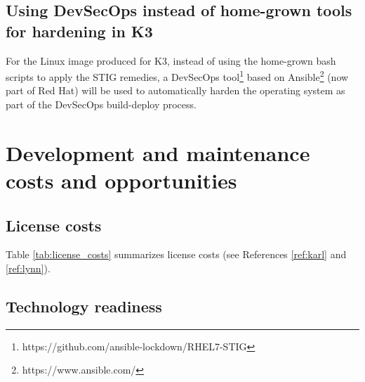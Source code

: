 \documentclass[12pt]{article}
\begin{document}
\subsection{Using DevSecOps instead of home-grown tools for hardening in K3}
For the Linux image produced for K3, instead of using the home-grown bash
scripts to apply the STIG remedies, a DevSecOps
tool\footnote{https://github.com/ansible-lockdown/RHEL7-STIG} based on
Ansible\footnote{https://www.ansible.com/} (now part of Red Hat) will be used to
automatically harden the operating system as part of the DevSecOps build-deploy
process.

%
\newpage
\section{Development and maintenance costs and opportunities}
\label{sec:costs_opportunities}


\subsection{License costs}


Table \ref{tab:license_costs} summarizes license costs (see References
\ref{ref:karl} and \ref{ref:lynn}).

\begin{table}[H]
\captionsetup{width=.9\linewidth}
\caption{License costs}
\label{tab:license_costs}
\end{table}

\subsection{Technology readiness}
\end{document}
